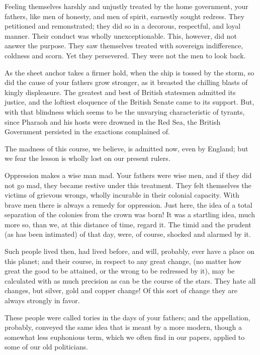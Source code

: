 Feeling themselves harshly and unjustly treated by the home government, your fathers, like men of honesty, and men of spirit, earnestly sought redress. They petitioned and remonstrated; they did so in a decorous, respectful, and loyal manner. Their conduct was wholly unexceptionable. This, however, did not answer the purpose. They saw themselves treated with sovereign indifference, coldness and scorn. Yet they persevered. They were not the men to look back.\par

As the sheet anchor takes a firmer hold, when the ship is tossed by the storm, so did the cause of your fathers grow stronger, as it breasted the chilling blasts of kingly displeasure. The greatest and best of British statesmen admitted its justice, and the loftiest eloquence of the British Senate came to its support. But, with that blindness which seems to be the unvarying characteristic of tyrants, since Pharaoh and his hosts were drowned in the Red Sea, the British Government persisted in the exactions complained of.\par

The madness of this course, we believe, is admitted now, even by England; but we fear the lesson is wholly lost on our present rulers.\par

Oppression makes a wise man mad. Your fathers were wise men, and if they did not go mad, they became restive under this treatment. They felt themselves the victims of grievous wrongs, wholly incurable in their colonial capacity. With brave men there is always a remedy for oppression. Just here, the idea of a total separation of the colonies from the crown was born! It was a startling idea, much more so, than we, at this distance of time, regard it. The timid and the prudent (as has been intimated) of that day, were, of course, shocked and alarmed by it.\par

Such people lived then, had lived before, and will, probably, ever have a place on this planet; and their course, in respect to any great change, (no matter how great the good to be attained, or the wrong to be redressed by it), may be calculated with as much precision as can be the course of the stars. They hate all changes, but silver, gold and copper change! Of this sort of change they are always strongly in favor.\par

These people were called tories in the days of your fathers; and the appellation, probably, conveyed the same idea that is meant by a more modern, though a somewhat less euphonious term, which we often find in our papers, applied to some of our old politicians.\par

